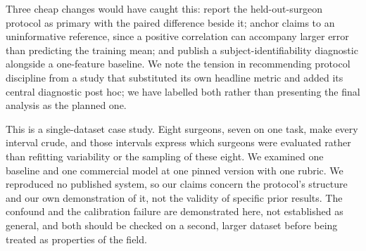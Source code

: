Three cheap changes would have caught this: report the held-out-surgeon protocol as primary with the paired difference beside it; anchor claims to an uninformative reference, since a positive correlation can accompany larger error than predicting the training mean; and publish a subject-identifiability diagnostic alongside a one-feature baseline. We note the tension in recommending protocol discipline from a study that substituted its own headline metric and added its central diagnostic post hoc; we have labelled both rather than presenting the final analysis as the planned one.

This is a single-dataset case study. Eight surgeons, seven on one task, make every interval crude, and those intervals express which surgeons were evaluated rather than refitting variability or the sampling of these eight. We examined one baseline and one commercial model at one pinned version with one rubric. We reproduced no published system, so our claims concern the protocol's structure and our own demonstration of it, not the validity of specific prior results. The confound and the calibration failure are demonstrated here, not established as general, and both should be checked on a second, larger dataset before being treated as properties of the field.
